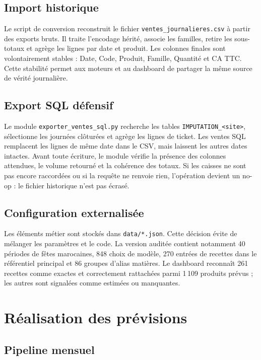\subsection{Import historique}

Le script de conversion reconstruit le fichier
\texttt{ventes\_journalieres.csv} à partir des exports bruts. Il traite l'encodage
hérité, associe les familles, retire les sous-totaux et agrège les lignes par date
et produit. Les colonnes finales sont volontairement stables : Date, Code,
Produit, Famille, Quantité et CA TTC. Cette stabilité permet aux moteurs et au
dashboard de partager la même source de vérité journalière.

\subsection{Export SQL défensif}

Le module \texttt{exporter\_ventes\_sql.py} recherche les tables
\texttt{IMPUTATION\_<site>}, sélectionne les journées clôturées et agrège les
lignes de ticket. Les ventes SQL remplacent les lignes de même date dans le CSV,
mais laissent les autres dates intactes. Avant toute écriture, le module vérifie
la présence des colonnes attendues, le volume retourné et la cohérence des totaux.
Si les caisses ne sont pas encore raccordées ou si la requête ne renvoie rien,
l'opération devient un no-op : le fichier historique n'est pas écrasé.

\subsection{Configuration externalisée}

Les éléments métier sont stockés dans \texttt{data/*.json}. Cette décision évite
de mélanger les paramètres et le code. La version auditée contient notamment 40
périodes de fêtes marocaines, 848 choix de modèle, 270 entrées de recettes dans le
référentiel principal et 86 groupes d'alias matières. Le dashboard reconnaît 261
recettes comme exactes et correctement rattachées parmi 1\,109 produits prévus ;
les autres sont signalées comme estimées ou manquantes.

\section{Réalisation des prévisions}

\subsection{Pipeline mensuel}


